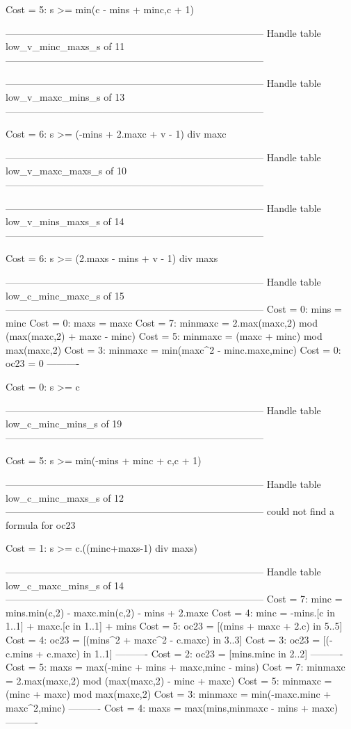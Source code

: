 Cost =  5:  s >= min(c - mins + minc,c + 1)

--------------------------------------------------------------------------------
Handle table low_v_minc_maxs_s of 11
--------------------------------------------------------------------------------


--------------------------------------------------------------------------------
Handle table low_v_maxc_mins_s of 13
--------------------------------------------------------------------------------

Cost =  6:  s >= (-mins + 2.maxc + v - 1) div maxc

--------------------------------------------------------------------------------
Handle table low_v_maxc_maxs_s of 10
--------------------------------------------------------------------------------


--------------------------------------------------------------------------------
Handle table low_v_mins_maxs_s of 14
--------------------------------------------------------------------------------

Cost =  6:  s >= (2.maxs - mins + v - 1) div maxs

--------------------------------------------------------------------------------
Handle table low_c_minc_maxc_s of 15
--------------------------------------------------------------------------------
Cost =  0:  mins    = minc
Cost =  0:  maxs    = maxc
Cost =  7:  minmaxc = 2.max(maxc,2) mod (max(maxc,2) + maxc - minc)
Cost =  5:  minmaxc = (maxc + minc) mod max(maxc,2)
Cost =  3:  minmaxc = min(maxc^2 - minc.maxc,minc)
Cost =  0:  oc23    = 0
----------

Cost =  0:  s >= c

--------------------------------------------------------------------------------
Handle table low_c_minc_mins_s of 19
--------------------------------------------------------------------------------

Cost =  5:  s >= min(-mins + minc + c,c + 1)

--------------------------------------------------------------------------------
Handle table low_c_minc_maxs_s of 12
--------------------------------------------------------------------------------
could not find a formula for oc23

Cost =  1:  s >= c.((minc+maxs-1) div maxs)

--------------------------------------------------------------------------------
Handle table low_c_maxc_mins_s of 14
--------------------------------------------------------------------------------
Cost =  7:  minc    = mins.min(c,2) - maxc.min(c,2) - mins + 2.maxc
Cost =  4:  minc    = -mins.[c in 1..1] + maxc.[c in 1..1] + mins
Cost =  5:  oc23    = [(mins + maxc + 2.c) in 5..5]
Cost =  4:  oc23    = [(mins^2 + maxc^2 - c.maxc) in 3..3]
Cost =  3:  oc23    = [(-c.mins + c.maxc) in 1..1]
----------
Cost =  2:  oc23    = [mins.minc in 2..2]
----------
Cost =  5:  maxs    = max(-minc + mins + maxc,minc - mins)
Cost =  7:  minmaxc = 2.max(maxc,2) mod (max(maxc,2) - minc + maxc)
Cost =  5:  minmaxc = (minc + maxc) mod max(maxc,2)
Cost =  3:  minmaxc = min(-maxc.minc + maxc^2,minc)
----------
Cost =  4:  maxs    = max(mins,minmaxc - mins + maxc)
----------

